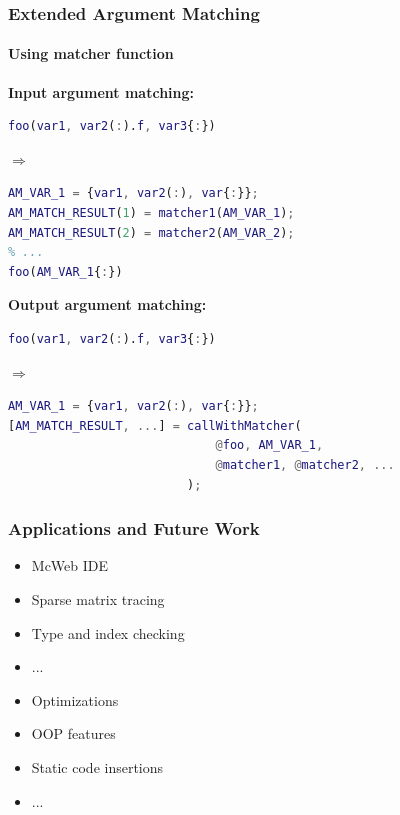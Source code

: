 \documentclass[10pt]{beamer}
\begin{document}
\begin{frame}[fragile]
\frametitle{Extended Argument Matching}
\framesubtitle{Using matcher function}
\textbf{Input argument matching:}
\begin{lstlisting}[basicstyle=\small, language=MATLAB]
foo(var1, var2(:).f, var3{:})
\end{lstlisting} 
$\Rightarrow$
\begin{lstlisting}[basicstyle=\small, language=MATLAB]
AM_VAR_1 = {var1, var2(:), var{:}};
AM_MATCH_RESULT(1) = matcher1(AM_VAR_1);
AM_MATCH_RESULT(2) = matcher2(AM_VAR_2);
% ...
foo(AM_VAR_1{:})
\end{lstlisting}

\textbf{Output argument matching:}
\begin{lstlisting}[basicstyle=\small, language=MATLAB]
foo(var1, var2(:).f, var3{:})
\end{lstlisting} 
$\Rightarrow$
\begin{lstlisting}[basicstyle=\small, language=MATLAB]
% callWithMatcher is a MEX implemented subroutine using C
AM_VAR_1 = {var1, var2(:), var{:}};
[AM_MATCH_RESULT, ...] = callWithMatcher(
                             @foo, AM_VAR_1, 
                             @matcher1, @matcher2, ...
                         );
\end{lstlisting}
\end{frame}

\begin{frame}
\frametitle{Applications and Future Work}
\begin{itemize}
    \item McWeb IDE
    \item Sparse matrix tracing
    \item Type and index checking
    \item ...
\end{itemize}

\pause

\begin{itemize}
    \item Optimizations
    \item OOP features
    \item Static code insertions
    \item ...
\end{itemize}
\end{frame}
\end{document}
